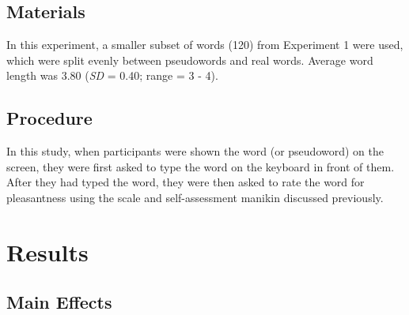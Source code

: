 \documentclass[english,man]{apa6}
\theoremstyle{definition}
\theoremstyle{definition}
\theoremstyle{definition}
\theoremstyle{remark}
\begin{document}
\subsection{Materials}\label{materials-1}

In this experiment, a smaller subset of words (120) from Experiment 1
were used, which were split evenly between pseudowords and real words.
Average word length was 3.80 (\emph{SD} = 0.40; range = 3 - 4).

\subsection{Procedure}\label{procedure-1}

In this study, when participants were shown the word (or pseudoword) on
the screen, they were first asked to type the word on the keyboard in
front of them. After they had typed the word, they were then asked to
rate the word for pleasantness using the scale and self-assessment
manikin discussed previously.

\section{Results}\label{results-1}

\subsection{Main Effects}\label{main-effects-1}
\end{document}
